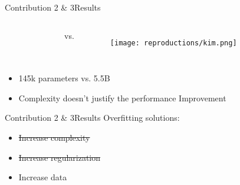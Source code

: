 \begin{frame}{Contribution 2 \& 3}{Results}
    \begin{columns}[c]
        \begin{figure}
            
        \end{figure}

        vs.

        \begin{figure}
            \texttt{[image: reproductions/kim.png]}
        \end{figure}
    \end{columns}

    \begin{table}[htbp]
        \centering
    \end{table}

    \begin{itemize}
        \item 145k parameters vs. 5.5B
        \item Complexity doesn't justify the performance Improvement
    \end{itemize}
\end{frame}

\begin{frame}{Contribution 2 \& 3}{Results}
    Overfitting solutions:
    \begin{itemize}
        \item \sout{Increase complexity}
        \item \sout{Increase regularization}
        \item Increase data
    \end{itemize}
\end{frame}


